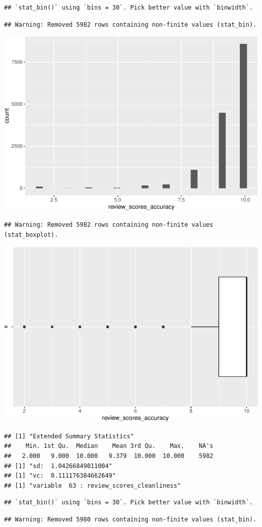 \begin{verbatim}
## `stat_bin()` using `bins = 30`. Pick better value with `binwidth`.
\end{verbatim}

\begin{verbatim}
## Warning: Removed 5982 rows containing non-finite values (stat_bin).
\end{verbatim}

\includegraphics[width=0.5\linewidth]{anal_files/figure-latex/figures-side-44}

\begin{verbatim}
## Warning: Removed 5982 rows containing non-finite values (stat_boxplot).
\end{verbatim}

\includegraphics[width=0.5\linewidth]{anal_files/figure-latex/figures-side-45}

\begin{verbatim}
## [1] "Extended Summary Statistics"
##    Min. 1st Qu.  Median    Mean 3rd Qu.    Max.    NA's 
##   2.000   9.000  10.000   9.379  10.000  10.000    5982 
## [1] "sd:  1.04266849011004"
## [1] "vc:  0.111176384662649"
## [1] "variable  63 : review_scores_cleanliness"
\end{verbatim}

\begin{verbatim}
## `stat_bin()` using `bins = 30`. Pick better value with `binwidth`.
\end{verbatim}

\begin{verbatim}
## Warning: Removed 5980 rows containing non-finite values (stat_bin).
\end{verbatim}


